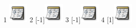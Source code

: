\documentclass{scrartcl}
\begin{document}
  1 \includegraphics[width=1cm,height=1cm]{dummy}
  2 \scalebox{1}[-1]{\includegraphics[width=1cm,height=1cm]{dummy}}
  3 \scalebox{-1}[-1]{\includegraphics[width=1cm,height=1cm]{dummy}}
  4 \scalebox{-1}[1]{\includegraphics[width=1cm,height=1cm]{dummy}}
\end{document}
